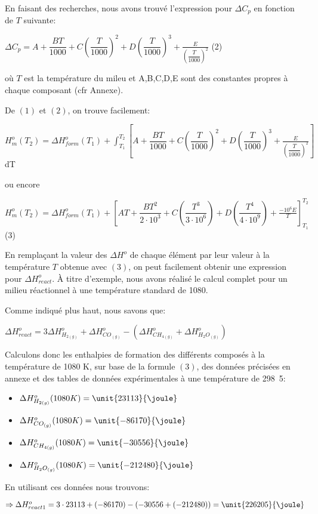 \documentclass[11pt,a4paper]{report}
\begin{document}
En faisant des recherches, nous avons trouvé l'expression pour $\Delta C_p$ en fonction de $T$ suivante:

$\Delta C_p=A+\dfrac{BT}{1000}+C(\dfrac{T}{1000})^2+D(\dfrac{T}{1000})^3+\frac{E}{(\dfrac{T}{1000})^2}$        (2)

où $T$ est la température du mileu et A,B,C,D,E sont des constantes propres à chaque composant (cfr Annexe).

De $(1)$ et $(2)$, on trouve facilement:

$H^o_m(T_2)=\Delta H^o_{form}(T_1)+\int_{T_1}^{T_2} [A+\dfrac{BT}{1000}+C(\dfrac{T}{1000})^2+D(\dfrac{T}{1000})^3+\frac{E}{(\dfrac{T}{1000})^2}]$dT

ou encore

$H^o_m(T_2)=\Delta H^o_{form}(T_1) + [AT+\dfrac{BT^2}{2\cdot10^3}+C(\dfrac{T^3}{3\cdot10^6})+D(\dfrac{T^4}{4\cdot10^9})+\frac{-10^6E}{T}]^{T_2}_{T_1}$(3) 

En remplaçant la valeur des $\Delta H^o$ de chaque élément par leur valeur à la température $T$ obtenue avec $(3)$, on
peut facilement obtenir une expression pour $\Delta H^o_{react}$. À titre d'exemple, nous avons réalisé le calcul complet
pour un milieu réactionnel à une température standard de \unit{1080}{\kelvin}.

Comme indiqué plus haut, nous savons que:

$\Delta H^o_{react}=3\Delta H^o_{H_{2(g)}} + \Delta H^o_{CO_{(g)}} - (\Delta H^o_{CH_{4(g)}} + \Delta H^o_{H_{2}O_{(g)}})$

Calculons donc les enthalpies de formation des différents composés à la température de 1080 K, sur base de la formule 
$(3)$, des données précisées en annexe et des tables de données expérimentales à une température de \unit{298.5}{\kelvin}:

\begin{itemize}
\item{$\Delta H^o_{H_{2(g)}} (1080K)= \unit{23113}{\joule}$}
\item{$\Delta H^o_{CO_{(g)}} (1080K)= \unit{-86170}{\joule}$}
\item{$\Delta H^o_{CH_{4(g)}} (1080K)= \unit{-30556}{\joule}$}
\item{$\Delta H^o_{H_{2}O_{(g)}} (1080K)= \unit{-212480}{\joule}$}
\end{itemize}

En utilisant ces données nous trouvons:

$\Rightarrow \Delta H^o_{react1}= 3\cdot 23113 + (-86170) - (-30556 + (-212480))= \unit{226205}{\joule}$
\end{document}
